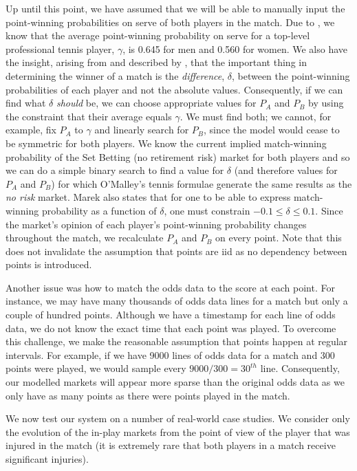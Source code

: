 \documentclass[authoryear, 12pt]{elsarticle}
\begin{document}
Up until this point, we have assumed that we will be able to manually input the point-winning probabilities on serve of both players in the match.  Due to \cite{dominance}, we know that the average point-winning probability on serve for a top-level professional tennis player, $\gamma$, is 0.645 for men and 0.560 for women.  We also have the insight, arising from \cite{omalley} and described by \cite{marek}, that the important thing in determining the winner of a match is the \textit{difference}, $\delta$, between the point-winning probabilities of each player and not the absolute values.  Consequently, if we can find what $\delta$ \textit{should} be, we can choose appropriate values for $P_A$ and $P_B$ by using the constraint that their average equals $\gamma$.  We must find both; we cannot, for example, fix $P_A$ to $\gamma$ and linearly search for $P_B$, since the model would cease to be symmetric for both players.  We know the current implied match-winning probability of the Set Betting (no retirement risk) market for both players and so we can do a simple binary search to find a value for $\delta$ (and therefore values for $P_A$ and $P_B$) for which O'Malley's tennis formulae generate the same results as the \textit{no risk} market.  Marek also states that for one to be able to express match-winning probability as a function of $\delta$, one must constrain $-0.1 \leq \delta \leq 0.1$.  Since the market's opinion of each player's point-winning probability changes throughout the match, we recalculate $P_A$ and $P_B$ on every point.  Note that this does not invalidate the assumption that points are iid as no dependency between points is introduced.

Another issue was how to match the odds data to the score at each point.  For instance, we may have many thousands of odds data lines for a match but only a couple of hundred points.  Although we have a timestamp for each line of odds data, we do not know the exact time that each point was played.  To overcome this challenge, we make the reasonable assumption that points happen at regular intervals.  For example, if we have 9000 lines of odds data for a match and 300 points were played, we would sample every $9000 / 300 = 30^{th}$ line.  Consequently, our modelled markets will appear more sparse than the original odds data as we only have as many points as there were points played in the match.

We now test our system on a number of real-world case studies.  We consider only the evolution of the in-play markets from the point of view of the player that was injured in the match (it is extremely rare that both players in a match receive significant injuries).
\end{document}
